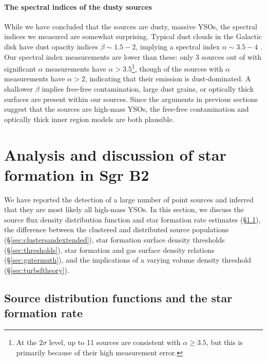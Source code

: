 \documentclass[twocolumn]{aastex61}
\begin{document}
\paragraph{The spectral indices of the dusty sources}
While we have concluded that the sources are dusty, massive YSOs, the
spectral indices we measured are somewhat surprising.  Typical dust clouds in
the Galactic disk have dust opacity indices $\beta\sim1.5-2$, implying 
a spectral index $\alpha\sim3.5-4$
\citep[$\beta=\alpha-2$;][]{Schnee2010a,Shirley2011a,Sadavoy2016a}.  Our spectral index measurements
are lower
than these:  only 3 sources out of \nalphas with significant $\alpha$
measurements have $\alpha > 3.5$\footnote{At the
$2\sigma$ level, up to 11 sources are consistent with $\alpha\geq3.5$, but this is
primarily because of their high measurement error.}, though \ngttwo of the
sources with $\alpha$ measurements have $\alpha>2$, indicating that their
emission is dust-dominated.  A shallower $\beta$ implies free-free
contamination, large dust grains, or optically thick surfaces are present
within our sources.  Since the arguments in previous sections suggest that the
sources are high-mass YSOs, the free-free contamination and optically thick
inner region models are both plausible.

\section{Analysis and discussion of star formation in Sgr B2}
\label{sec:sfdiscussion}

We have reported the detection of a large number of point sources and inferred
that they are most likely all high-mass YSOs.  In this section,
we discuss
the source flux density distribution function and star formation rate estimates
(\S \ref{sec:distributionsandsfr}), the difference between the clustered and
distributed source populations (\S \ref{sec:clustersandextended}), star
formation surface density thresholds (\S \ref{sec:thresholds}), star formation
and gas surface density relations (\S \ref{sec:gutermuth}), and the
implications of a varying volume density threshold (\S \ref{sec:turbsftheory}).


\subsection{Source distribution functions and the star formation rate}
\label{sec:distributionsandsfr}
\end{document}

